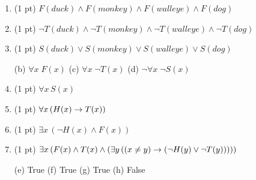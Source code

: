 \begin{questions}
\begin{enumerate}[label=(\alph*)]
  \item (1 pt)  \hspace*{0.15in}$F(duck) \wedge F(monkey) \wedge F(walleye) \wedge F(dog)$
  \item (1 pt)  \hspace*{0.15in}$\neg T(duck) \wedge \neg T(monkey) \wedge \neg T(walleye) \wedge \neg T(dog) $
  \item (1 pt)  \hspace*{0.15in}$S(duck) \vee S(monkey) \vee S(walleye) \vee S(dog)$
      \begin{solution}
        (b) $\forall x\; F(x)$
        \hspace*{0.5in} (c) $\forall x\; \neg T(x)$
        \hspace*{0.5in} (d) $\neg \forall x\; \neg S(x)$ 
      \end{solution}

  \item (1 pt) \hspace*{0.15in}  $\forall x\, S(x)$ 
  \item (1 pt) \hspace*{0.15in} $\forall x\, (H(x) \rightarrow T(x))$
  \item (1 pt) \hspace*{0.15in} $\exists x\, (\neg H(x) \wedge F(x)) $
  \item (1 pt) \hspace*{0.15in} $\exists x\, (F(x) \wedge T(x) \wedge (\exists y\, ((x \neq y)  \rightarrow (\neg H(y) \vee \neg T(y)))))$
    \begin{solution}
      (e) True 
      \hspace*{0.15in} (f) True 
      \hspace*{0.15in} (g) True
      \hspace*{0.15in} (h) False
    \end{solution}

\end{enumerate}





\end{questions}
